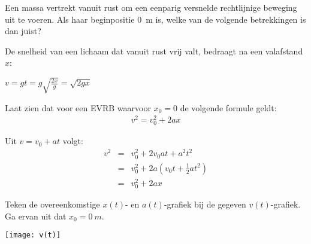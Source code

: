 \documentclass{ximera}
\begin{document}

\begin{exercise}
	Een massa vertrekt vanuit rust om een eenparig versnelde rechtlijnige beweging uit te voeren. Als haar beginpositie \SI{0}{m} is, welke van de volgende betrekkingen is dan juist?
	\begin{multipleChoice}
	\end{multipleChoice}
\end{exercise}

\begin{exercise}
	De snelheid van een lichaam dat vanuit rust vrij valt, bedraagt na een valafstand $x$:
	\begin{multipleChoice}
		\choice{$v=2gx$}
		\choice[correct]{$v=\sqrt{2gx}$}
		\choice{$v=gx$}
		\choice{$v=\sqrt{\frac{gx}{2}}$}
	\end{multipleChoice}
	\begin{oplossing}
		$v=gt=g\sqrt{\frac{2x}{g}}=\sqrt{2gx}$
	\end{oplossing}
\end{exercise}

\begin{exercise}
	Laat zien dat voor een EVRB waarvoor $x_0=0$ de volgende formule geldt:
	\begin{eqnarray*}
		v^2=v_0^2+2ax
	\end{eqnarray*}

	\begin{oplossing}
		Uit $v=v_0+at$ volgt:
		\begin{eqnarray*}
			v^2&=&v_0^2+2v_0at+a^2t^2\\
			&=&v_0^2+2a(v_0t+\frac{1}{2}at^2)\\
			&=&v_0^2+2ax
		\end{eqnarray*}
	\end{oplossing}
\end{exercise}



\begin{exercise}
	Teken de overeenkomstige $x(t)$- en $a(t)$-grafiek bij de gegeven $v(t)$-grafiek. Ga ervan uit dat $x_0=\SI{0}{m}$.
	\begin{image}[0.3\textwidth]
		\texttt{[image: v(t)]}
	\end{image}
\end{exercise}
\end{document}
